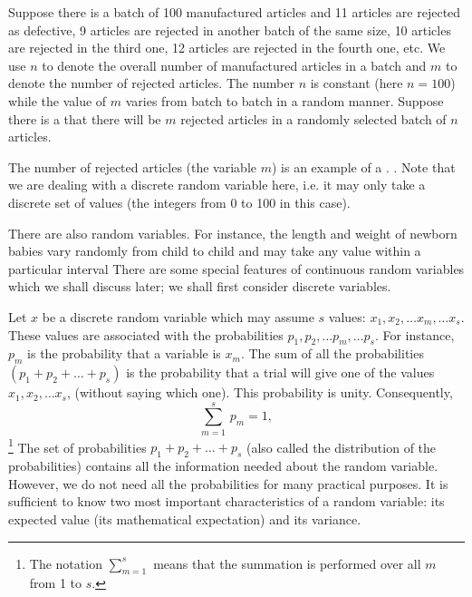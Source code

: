   Suppose there is a batch of {100}
manufactured articles and {11} articles are rejected as defective, {9}
articles are rejected in another batch of the same size, {10} articles
are rejected in the third one, {12} articles are rejected in the fourth
one, etc. We use $n$ to denote the overall number of manufactured
articles in a batch and $m$ to denote the number of rejected
articles. The number $n$ is constant (here $n = 100$) while the value of $m$
varies from batch to batch in a random manner. Suppose there is a
 that there will be $m$ rejected articles in a
randomly selected batch of $n$ articles.  


The number of rejected articles (the variable $m$) is an example of a
. . Note that we are dealing with a
discrete random variable here, i.e. it may only take a discrete set of
values (the integers from {0} to {100} in this case).

There are also  random variables. For instance, the
length and weight of newborn babies vary randomly from child to child
and may take any value within a particular interval There are some
special features of continuous random variables which we shall discuss
later; we shall first consider discrete variables.


Let $x$ be a discrete random variable which may assume $s$ values: $x_{1}, x_{2},
\ldots x_{m},  \ldots x_{s} $. These values are associated with the probabilities  $p_{1}, p_{2},
\ldots p_{m},  \ldots p_{s} $. For instance, $p_{m}$ is the probability that a variable is $x_{m}$. The sum of all the probabilities $( p_{1} + p_{2} +  \ldots + p_{s})$ is the probability that a trial will give one of the values  $x_{1}, x_{2},  \ldots x_{s} $, (without saying which one). This probability is unity. Consequently,
\begin{equation}%
\sum_{m=1}^{s} \, p_{m}= 1,
\label{eq-1.3}
\end{equation}
\footnote{The notation $\displaystyle \sum_{m=1}^{s}$ means that the summation is performed over all $m$ from 1 to $s$.}
The set of probabilities $p_{1} + p_{2} + \ldots + p_{s}$ (also called
the distribution of the probabilities) contains all the information
needed about the random variable. However, we do not need all the
probabilities for many practical purposes. It is sufﬁcient to know two
most important characteristics of a random variable: its expected
value (its mathematical expectation) and its variance.

